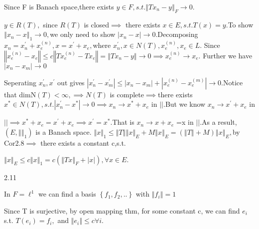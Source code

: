 \documentclass{article}
\begin{document}
Since F is Banach space,there exists $y\in F,s.t.\left\Vert
Tx_{n}-y\right\Vert _{F}\rightarrow 0.$

$y\in R\left( T\right) ,$ since $R\left( T\right) $ is closed$\implies $%
there exists $x\in E,s.t.T\left( x\right) =y.$To show $\left\Vert
x_{n}-x\right\Vert _{1}\rightarrow 0,$we only need to show $\left\vert
x_{n}-x\right\vert \rightarrow 0.$Decomposing $x_{n}=x_{n}^{\prime
}+x_{e}^{\left( n\right) },x=x^{\prime }+x_{e},$where $x_{n}^{\prime },x\in
N\left( T\right) ,x_{e}^{\left( n\right) },x_{e}\in L.$ Since $\left\Vert
x_{e}^{\left( n\right) }-x_{e}\right\Vert \leq c\left\Vert Tx_{e}^{\left(
n\right) }-Tx_{e}\right\Vert =\left\Vert Tx_{n}-y\right\Vert \rightarrow
0\implies x_{e}^{\left( n\right) }\rightarrow x_{e}.$ Further we have  $%
\left\vert x_{n}-x_{m}\right\vert \rightarrow 0$

Seperating $x_{n}^{\prime },x^{\prime }$ out gives $\left\vert x_{n}^{\prime
}-x_{m}^{\prime }\right\vert \leq \allowbreak \left\vert
x_{n}-x_{m}\right\vert +\left\vert x_{e}^{\left( n\right) }-x_{e}^{\left(
m\right) }\right\vert \rightarrow 0.$Notice that dimN$\left( T\right)
<\infty ,\implies N\left( T\right) $ is complete$\implies $there exists $%
x^{\ast }\in N\left( T\right) ,s.t.\left\vert x_{n}^{\prime }-x^{\ast
}\right\vert \rightarrow 0\implies x_{n}\rightarrow x^{\ast }+x_{e}$ in $%
\left\vert {}\right\vert .$But we know $x_{n}\rightarrow x^{\prime }+x_{e}$
in

$\left\vert {}\right\vert \implies x^{\ast }+x_{e}=x^{\prime }+x_{e}\implies
x^{\prime }=x^{\ast }.$That is $x_{n}\rightarrow x+x_{e}$ =x in $\left\vert
{}\right\vert .$As a result, $\left( E,\left\Vert {}\right\Vert _{1}\right) $
is a Banach space. $\left\Vert x\right\Vert _{1}\leq \left\Vert T\right\Vert
\left\Vert x\right\Vert _{E}+M\left\Vert x\right\Vert _{E}=\left( \left\Vert
T\right\Vert +M\right) \left\Vert x\right\Vert _{E},$by Cor2.8$\implies $%
there exists a constant c,s.t.

$\left\Vert x\right\Vert _{E}\leq c\left\Vert x\right\Vert _{1}=c\left(
\left\Vert Tx\right\Vert _{F}+\left\vert x\right\vert \right) ,\forall x\in
E.$

2.11

\bigskip In $F=\ell ^{1}$ we can find a basis $\left\{
f_{1},f_{2},..\right\} $ with $\left\Vert f_{i}\right\Vert =1$

Since T is surjective, by open mapping thm, for some constant c, we can find 
$e_{i}$ s.t. $T\left( e_{i}\right) =f_{i},$ and $\left\Vert e_{i}\right\Vert
\leq c\forall i.$ 
\end{document}

